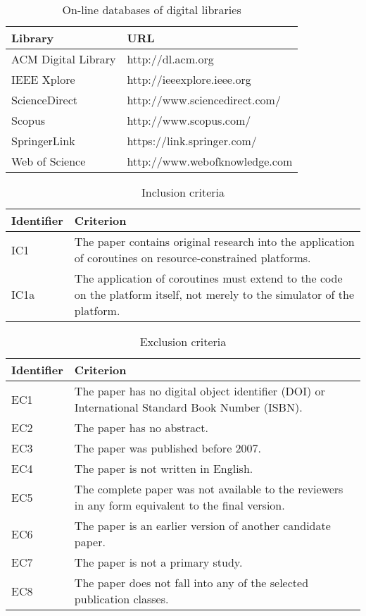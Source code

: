 \begin{screenonly}
\begin{table}[h]
	\caption{On-line databases of digital libraries}
	
	\begin{tabular}{l l}
		\hline
		Library	& URL \\
		\hline
		ACM Digital Library & http://dl.acm.org \\
		IEEE Xplore & http://ieeexplore.ieee.org \\
		ScienceDirect & http://www.sciencedirect.com/ \\
		Scopus & http://www.scopus.com/ \\
		SpringerLink & https://link.springer.com/ \\
		Web of Science & http://www.webofknowledge.com \\
		\hline
	\end{tabular}
\end{table}
	
\begin{table}[h]
	\caption{Inclusion criteria}
	
	\begin{tabular} {l p{10cm} }
		\hline
		Identifier & Criterion \\
		\hline
		IC1 & The paper contains original research into the application of coroutines on resource-constrained platforms.\\
		IC1a & The application of coroutines must extend to the code on the platform itself, not merely to the simulator of the platform.\\
		\hline
	\end{tabular}
\end{table}

\begin{table}[h]
	\caption{Exclusion criteria}
	
	\begin{tabular} {l p{10cm} }
		\hline
		Identifier & Criterion \\
		\hline
		EC1 & The paper has no digital object identifier (DOI) or International Standard Book Number (ISBN).\\
		EC2 & The paper has no abstract.\\
		EC3 & The paper was published before 2007.\\
		EC4 & The paper is not written in English.\\
		EC5 & The complete paper was not available to the reviewers in any form equivalent to the final version.\\
		EC6 & The paper is an earlier version of another candidate paper. \\
		EC7 & The paper is not a primary study. \\
		EC8 & The paper does not fall into any of the selected publication classes. \\
		\hline
	\end{tabular}
\end{table}
\end{screenonly}
